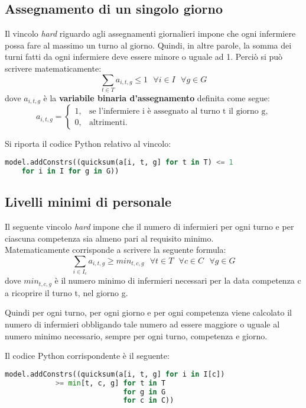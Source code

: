 \subsection{Assegnamento di un singolo giorno}
Il vincolo \textit{hard} riguardo agli assegnamenti giornalieri impone che ogni infermiere possa fare al massimo un turno al giorno. Quindi, in altre parole, la somma dei turni fatti da ogni infermiere deve essere minore o uguale ad 1. Perciò si può scrivere matematicamente:
\begin{equation}
\sum_{t \in T} a_{i, t, g} \leq 1 ~~~ \forall i \in I ~~~ \forall g \in G
\end{equation}
dove $a_{i, t, g}$ è la \textbf{variabile binaria d'assegnamento} definita come segue:
\begin{equation}
\label{eq:varAssegnamento}
a_{i, t, g}=
\begin{cases}
1, & \text{se l'infermiere i è assegnato al turno t il giorno g,} \\
0, & \text{altrimenti.}
\end{cases}
\end{equation}

Si riporta il codice Python relativo al vincolo:
\begin{lstlisting}[language=Python]
model.addConstrs((quicksum(a[i, t, g] for t in T) <= 1 
	for i in I for g in G))
\end{lstlisting}


\subsection{Livelli minimi di personale}
Il seguente vincolo \textit{hard} impone che il numero di infermieri per ogni turno e per ciascuna competenza sia almeno pari al requisito minimo. \\
Matematicamente corrisponde a scrivere la seguente formula:
\begin{equation}
\sum_{i \in I_c} a_{i,t,g} \geq min_{t,c,g} ~~~ \forall t \in T ~~~ \forall c \in C ~~~ \forall g \in G
\end{equation}
dove $min_{t,c,g}$ è il numero minimo di infermieri necessari per la data competenza c a ricoprire il turno t, nel giorno g.

Quindi per ogni turno, per ogni giorno e per ogni competenza viene calcolato il numero di infermieri obbligando tale numero ad essere maggiore o uguale al numero minimo necessario, sempre per ogni turno, competenza e giorno.

Il codice Python corrispondente è il seguente:
\begin{lstlisting}[language=Python]
model.addConstrs((quicksum(a[i, t, g] for i in I[c]) 
			>= min[t, c, g] for t in T
							for g in G
							for c in C))
\end{lstlisting}


